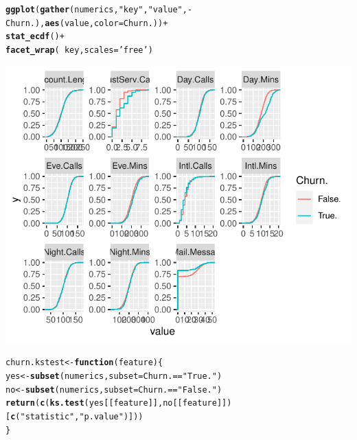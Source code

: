 \documentclass{article}\usepackage[]{graphicx}\usepackage[]{color}
\makeatletter
\def\maxwidth{ %
  \ifdim\Gin@nat@width>\linewidth
    \linewidth
  \else
    \Gin@nat@width
  \fi
}
\newcommand{\hlstr}[1]{\textcolor[rgb]{0.192,0.494,0.8}{#1}}%
\newcommand{\hlopt}[1]{\textcolor[rgb]{0,0,0}{#1}}%
\newcommand{\hlstd}[1]{\textcolor[rgb]{0.345,0.345,0.345}{#1}}%
\newcommand{\hlkwa}[1]{\textcolor[rgb]{0.161,0.373,0.58}{\textbf{#1}}}%
\newcommand{\hlkwb}[1]{\textcolor[rgb]{0.69,0.353,0.396}{#1}}%
\newcommand{\hlkwc}[1]{\textcolor[rgb]{0.333,0.667,0.333}{#1}}%
\newcommand{\hlkwd}[1]{\textcolor[rgb]{0.737,0.353,0.396}{\textbf{#1}}}%
\newenvironment{kframe}{%
 \def\at@end@of@kframe{}%
 \ifinner\ifhmode%
  \def\at@end@of@kframe{\end{minipage}}%
  \begin{minipage}{\columnwidth}%
 \fi\fi%
 \def\FrameCommand##1{\hskip\@totalleftmargin \hskip-\fboxsep
 \colorbox{shadecolor}{##1}\hskip-\fboxsep
     \hskip-\linewidth \hskip-\@totalleftmargin \hskip\columnwidth}%
 \MakeFramed {\advance\hsize-\width
   \@totalleftmargin\z@ \linewidth\hsize
   \@setminipage}}%
 {\par\unskip\endMakeFramed%
 \at@end@of@kframe}
\newenvironment{knitrout}{}{} %
\makeatother
\begin{document}
\begin{knitrout}
{}


\begin{kframe}\begin{alltt}
\hlkwd{ggplot}\hlstd{(}\hlkwd{gather}\hlstd{(numerics,} \hlstr{"key"}\hlstd{,} \hlstr{"value"}\hlstd{,} \hlopt{-}\hlstd{Churn.),} \hlkwd{aes}\hlstd{(value,} \hlkwc{color}\hlstd{=Churn.))} \hlopt{+}
  \hlkwd{stat_ecdf}\hlstd{()} \hlopt{+}
  \hlkwd{facet_wrap}\hlstd{(}\hlopt{~}\hlstd{key,} \hlkwc{scales}\hlstd{=}\hlstr{'free'}\hlstd{)}
\end{alltt}
\end{kframe}

{\centering \includegraphics[width=\maxwidth]{figure/Overviews_plots_grouped-4} 

}



\end{knitrout}

\begin{knitrout}
\color{fgcolor}\begin{kframe}
\begin{alltt}
\hlstd{churn.kstest} \hlkwb{<-} \hlkwa{function}\hlstd{(}\hlkwc{feature}\hlstd{) \{}
  \hlstd{yes} \hlkwb{<-} \hlkwd{subset}\hlstd{(numerics,} \hlkwc{subset}\hlstd{=Churn.}\hlopt{==}\hlstr{"True."}\hlstd{)}
  \hlstd{no} \hlkwb{<-} \hlkwd{subset}\hlstd{(numerics,} \hlkwc{subset}\hlstd{=Churn.}\hlopt{==}\hlstr{"False."}\hlstd{)}
  \hlkwd{return}\hlstd{(}\hlkwd{c}\hlstd{(}\hlkwd{ks.test}\hlstd{(yes[[feature]], no[[feature]])[}\hlkwd{c}\hlstd{(}\hlstr{"statistic"}\hlstd{,} \hlstr{"p.value"}\hlstd{)]))}
\hlstd{\}}
\end{alltt}
\end{kframe}
\end{knitrout}
\end{document}

